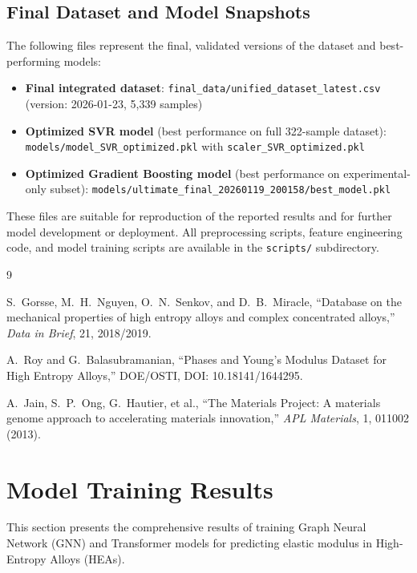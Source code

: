 \documentclass[11pt,a4paper]{article}
\begin{document}
\subsection*{Final Dataset and Model Snapshots}

The following files represent the final, validated versions of the dataset and best-performing models:

\begin{itemize}
  \item \textbf{Final integrated dataset}: \texttt{final\_data/unified\_dataset\_latest.csv} (version: 2026-01-23, 5{,}339 samples)
  \item \textbf{Optimized SVR model} (best performance on full 322-sample dataset): \texttt{models/model\_SVR\_optimized.pkl} with \texttt{scaler\_SVR\_optimized.pkl}
  \item \textbf{Optimized Gradient Boosting model} (best performance on experimental-only subset): \texttt{models/ultimate\_final\_20260119\_200158/best\_model.pkl}
\end{itemize}

These files are suitable for reproduction of the reported results and for further model development or deployment. All preprocessing scripts, feature engineering code, and model training scripts are available in the \texttt{scripts/} subdirectory.

\begin{thebibliography}{9}

S.~Gorsse, M.~H.~Nguyen, O.~N.~Senkov, and D.~B.~Miracle,
``Database on the mechanical properties of high entropy alloys and complex concentrated alloys,'' \emph{Data in Brief}, 21, 2018/2019.

A.~Roy and G.~Balasubramanian,
``Phases and Young's Modulus Dataset for High Entropy Alloys,'' DOE/OSTI, DOI: 10.18141/1644295.

A.~Jain, S.~P.~Ong, G.~Hautier, et al.,
``The Materials Project: A materials genome approach to accelerating materials innovation,'' \emph{APL Materials}, 1, 011002 (2013).

\end{thebibliography}

\section{Model Training Results}

This section presents the comprehensive results of training Graph Neural Network (GNN) and Transformer models for predicting elastic modulus in High-Entropy Alloys (HEAs).
\end{document}
